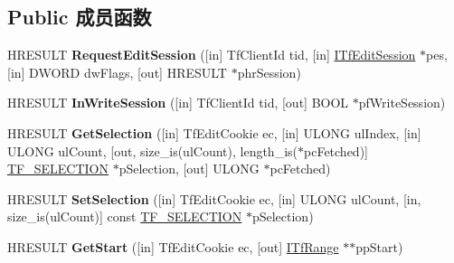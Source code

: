 \subsection*{Public 成员函数}
\begin{DoxyCompactItemize}
\item 
\mbox{\label{interface_i_tf_context_a1088313ab33e4de3be49cae622574dd9}} 
H\+R\+E\+S\+U\+LT {\bfseries Request\+Edit\+Session} (\mbox{[}in\mbox{]} Tf\+Client\+Id tid, \mbox{[}in\mbox{]} \hyperlink{interface_i_tf_edit_session}{I\+Tf\+Edit\+Session} $\ast$pes, \mbox{[}in\mbox{]} D\+W\+O\+RD dw\+Flags, \mbox{[}out\mbox{]} H\+R\+E\+S\+U\+LT $\ast$phr\+Session)
\item 
\mbox{\label{interface_i_tf_context_a047ad4e99969c962779a6235f362e0a8}} 
H\+R\+E\+S\+U\+LT {\bfseries In\+Write\+Session} (\mbox{[}in\mbox{]} Tf\+Client\+Id tid, \mbox{[}out\mbox{]} B\+O\+OL $\ast$pf\+Write\+Session)
\item 
\mbox{\label{interface_i_tf_context_a994ce529bcb1e68ac0e81646a8a75b90}} 
H\+R\+E\+S\+U\+LT {\bfseries Get\+Selection} (\mbox{[}in\mbox{]} Tf\+Edit\+Cookie ec, \mbox{[}in\mbox{]} U\+L\+O\+NG ul\+Index, \mbox{[}in\mbox{]} U\+L\+O\+NG ul\+Count, \mbox{[}out, size\+\_\+is(ul\+Count), length\+\_\+is($\ast$pc\+Fetched)\mbox{]} \hyperlink{struct_i_tf_context_1_1_t_f___s_e_l_e_c_t_i_o_n}{T\+F\+\_\+\+S\+E\+L\+E\+C\+T\+I\+ON} $\ast$p\+Selection, \mbox{[}out\mbox{]} U\+L\+O\+NG $\ast$pc\+Fetched)
\item 
\mbox{\label{interface_i_tf_context_a599bb46f09e13010894231f50e1702f4}} 
H\+R\+E\+S\+U\+LT {\bfseries Set\+Selection} (\mbox{[}in\mbox{]} Tf\+Edit\+Cookie ec, \mbox{[}in\mbox{]} U\+L\+O\+NG ul\+Count, \mbox{[}in, size\+\_\+is(ul\+Count)\mbox{]} const \hyperlink{struct_i_tf_context_1_1_t_f___s_e_l_e_c_t_i_o_n}{T\+F\+\_\+\+S\+E\+L\+E\+C\+T\+I\+ON} $\ast$p\+Selection)
\item 
\mbox{\label{interface_i_tf_context_a3230d8a2beb31790e89c975e04cd101b}} 
H\+R\+E\+S\+U\+LT {\bfseries Get\+Start} (\mbox{[}in\mbox{]} Tf\+Edit\+Cookie ec, \mbox{[}out\mbox{]} \hyperlink{interface_i_tf_range}{I\+Tf\+Range} $\ast$$\ast$pp\+Start)
\item 
\mbox{\label{interface_i_tf_context_a3711dcbf5f2b2af5fbafaef6e2a6e915}} 
$$
\end{DoxyCompactItemize}
